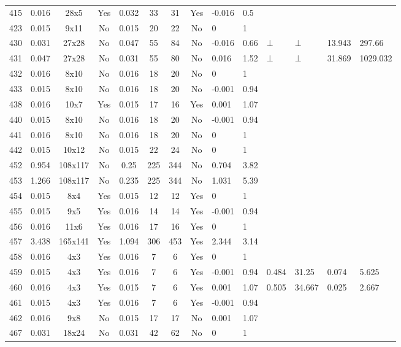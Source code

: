 \documentclass[11pt]{article}
\begin{document}
\begin{landscape}
\begin{small}
\begin{longtable}[c]{| c | c | c | c |c |c |c |c |p{1.5cm} |p{1.5cm} |p{1.5cm} |p{1.5cm} |p{1.5cm} |p{1.5cm} |}
415 & 0.016 & 28x5 & Yes & 0.032 & 33 & 31 & Yes & -0.016 & 0.5 &  &  &  & \\
423 & 0.015 & 9x11 & No & 0.015 & 20 & 22 & No & 0 & 1 &  &  &  & \\
430 & 0.031 & 27x28 & No & 0.047 & 55 & 84 & No & -0.016 & 0.66 & $\bot$ & $\bot$ & 13.943 & 297.66\\
431 & 0.047 & 27x28 & No & 0.031 & 55 & 80 & No & 0.016 & 1.52 & $\bot$ & $\bot$ & 31.869 & 1029.032\\
432 & 0.016 & 8x10 & No & 0.016 & 18 & 20 & No & 0 & 1 &  &  &  & \\
433 & 0.015 & 8x10 & No & 0.016 & 18 & 20 & No & -0.001 & 0.94 &  &  &  & \\
438 & 0.016 & 10x7 & Yes & 0.015 & 17 & 16 & Yes & 0.001 & 1.07 &  &  &  & \\
440 & 0.015 & 8x10 & No & 0.016 & 18 & 20 & No & -0.001 & 0.94 &  &  &  & \\
441 & 0.016 & 8x10 & No & 0.016 & 18 & 20 & No & 0 & 1 &  &  &  & \\
442 & 0.015 & 10x12 & No & 0.015 & 22 & 24 & No & 0 & 1 &  &  &  & \\
452 & 0.954 & 108x117 & No & 0.25 & 225 & 344 & No & 0.704 & 3.82 &  &  &  & \\
453 & 1.266 & 108x117 & No & 0.235 & 225 & 344 & No & 1.031 & 5.39 &  &  &  & \\
454 & 0.015 & 8x4 & Yes & 0.015 & 12 & 12 & Yes & 0 & 1 &  &  &  & \\
455 & 0.015 & 9x5 & Yes & 0.016 & 14 & 14 & Yes & -0.001 & 0.94 &  &  &  & \\
456 & 0.016 & 11x6 & Yes & 0.016 & 17 & 16 & Yes & 0 & 1 &  &  &  & \\
457 & 3.438 & 165x141 & Yes & 1.094 & 306 & 453 & Yes & 2.344 & 3.14 &  &  &  & \\
458 & 0.016 & 4x3 & Yes & 0.016 & 7 & 6 & Yes & 0 & 1 &  &  &  & \\
459 & 0.015 & 4x3 & Yes & 0.016 & 7 & 6 & Yes & -0.001 & 0.94 & 0.484 & 31.25 & 0.074 & 5.625\\
460 & 0.016 & 4x3 & Yes & 0.015 & 7 & 6 & Yes & 0.001 & 1.07 & 0.505 & 34.667 & 0.025 & 2.667\\
461 & 0.015 & 4x3 & Yes & 0.016 & 7 & 6 & Yes & -0.001 & 0.94 &  &  &  & \\
462 & 0.016 & 9x8 & No & 0.015 & 17 & 17 & No & 0.001 & 1.07 &  &  &  & \\
467 & 0.031 & 18x24 & No & 0.031 & 42 & 62 & No & 0 & 1 &  &  &  & \\

\end{longtable}
\end{small}
\end{landscape}
\end{document}
